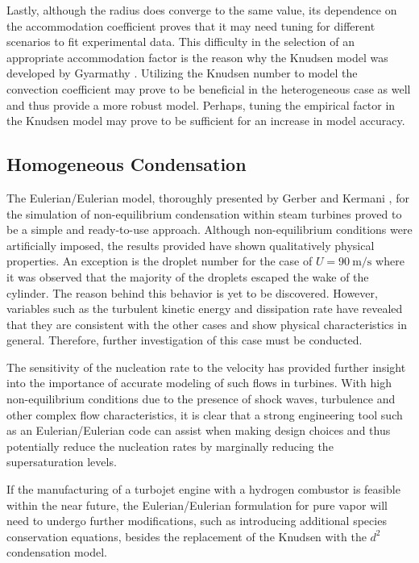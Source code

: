 \documentclass[12pt]{article}
\numberwithin{equation}{section}
\begin{document}
Lastly, although the radius does converge to the same value, its dependence on the accommodation coefficient proves that it may need tuning for different scenarios to fit experimental data. This difficulty in the selection of an appropriate accommodation factor is the reason why the Knudsen model was developed by Gyarmathy \cite{gyarmathy1962grundlagen}. Utilizing the Knudsen number to model the convection coefficient may prove to be beneficial in the heterogeneous case as well and thus provide a more robust model. Perhaps, tuning the empirical factor in the Knudsen model may prove to be sufficient for an increase in model accuracy. 
\subsection{Homogeneous Condensation}
The Eulerian/Eulerian model, thoroughly presented by Gerber and Kermani \cite{gerber2004pressure}, for the simulation of non-equilibrium condensation within steam turbines proved to be a simple and ready-to-use approach. Although non-equilibrium conditions were artificially imposed, the results provided have shown qualitatively physical properties. An exception is the droplet number for the case of $U=90\:\mathrm{m/s}$ where it was observed that the majority of the droplets escaped the wake of the cylinder. The reason behind this behavior is yet to be discovered. However, variables such as the turbulent kinetic energy and dissipation rate have revealed that they are consistent with the other cases and show physical characteristics in general. Therefore, further investigation of this case must be conducted.

The sensitivity of the nucleation rate to the velocity has provided further insight into the importance of accurate modeling of such flows in turbines. With high non-equilibrium conditions due to the presence of shock waves, turbulence and other complex flow characteristics, it is clear that a strong engineering tool such as an Eulerian/Eulerian code can assist when making design choices and thus potentially reduce the nucleation rates by marginally reducing the supersaturation levels. 

If the manufacturing of a turbojet engine with a hydrogen combustor is feasible within the near future, the Eulerian/Eulerian formulation for pure vapor will need to undergo further modifications, such as introducing additional species conservation equations, besides the replacement of the Knudsen with the $d^{2}$ condensation model.   
\end{document}
